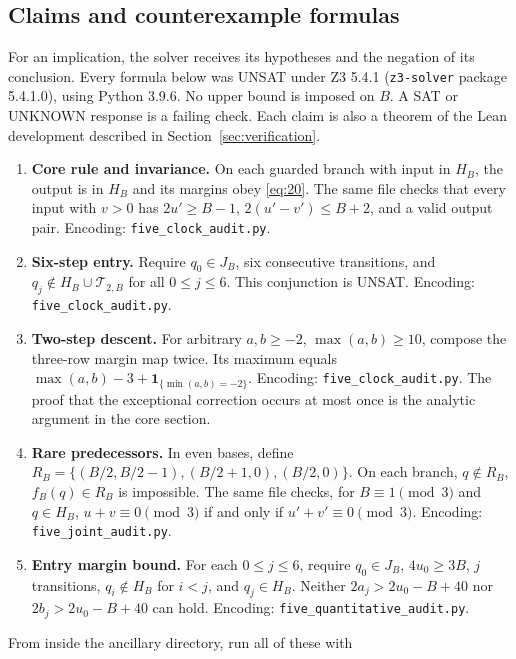 \documentclass[11pt]{amsart}
\begin{document}
\subsection{Claims and counterexample formulas}\label{app:claims}

For an implication, the solver receives its hypotheses and the negation of its conclusion. Every formula below was UNSAT under Z3 5.4.1 (\texttt{z3-solver} package 5.4.1.0), using Python 3.9.6. No upper bound is imposed on \(B\). A SAT or UNKNOWN response is a failing check. Each claim is also a theorem of the Lean development described in Section~\ref{sec:verification}.

\begin{enumerate}
\def\labelenumi{\arabic{enumi}.}
\item
  \textbf{Core rule and invariance.} On each guarded branch with input in \(H_B\), the output is in \(H_B\) and its margins obey \eqref{eq:20}. The same file checks that every input with \(v>0\) has \(2u'\ge B-1\), \(2(u'-v')\le B+2\), and a valid output pair. Encoding: \texttt{five\_clock\_audit.py}.
\item
  \textbf{Six-step entry.} Require \(q_0\in J_B\), six consecutive transitions, and \(q_j\notin H_B\cup\mathcal T_{2,B}\) for all \(0\le j\le6\). This conjunction is UNSAT. Encoding: \texttt{five\_clock\_audit.py}.
\item
  \textbf{Two-step descent.} For arbitrary \(a,b\ge-2\), \(\max(a,b)\ge10\), compose the three-row margin map twice. Its maximum equals \(\max(a,b)-3+\mathbf1_{\{\min(a,b)=-2\}}\). Encoding: \texttt{five\_clock\_audit.py}. The proof that the exceptional correction occurs at most once is the analytic argument in the core section.
\item
  \textbf{Rare predecessors.} In even bases, define \(R_B=\{(B/2,B/2-1),(B/2+1,0),(B/2,0)\}\). On each branch, \(q\notin R_B\), \(f_B(q)\in R_B\) is impossible. The same file checks, for \(B\equiv1\pmod3\) and \(q\in H_B\), \(u+v\equiv0\pmod3\) if and only if \(u'+v'\equiv0\pmod3\). Encoding: \texttt{five\_joint\_audit.py}.
\item
  \textbf{Entry margin bound.} For each \(0\le j\le6\), require \(q_0\in J_B\), \(4u_0\ge3B\), \(j\) transitions, \(q_i\notin H_B\) for \(i<j\), and \(q_j\in H_B\). Neither \(2a_j>2u_0-B+40\) nor \(2b_j>2u_0-B+40\) can hold. Encoding: \texttt{five\_quantitative\_audit.py}.
\end{enumerate}

From inside the ancillary directory, run all of these with
\end{document}
